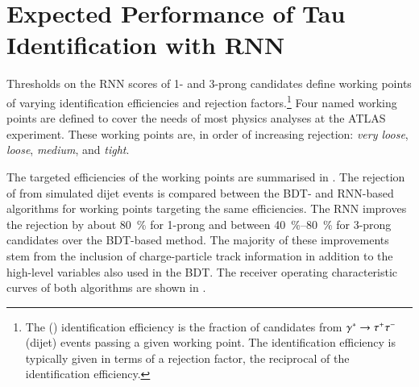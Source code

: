 \section{Expected Performance of Tau Identification with RNN}%
\label{sec:tauid_perf}

Thresholds on the RNN scores of 1- and 3-prong \tauhadvis candidates
define working points of varying \tauhadvis identification
efficiencies and \faketauhadvis rejection factors.\footnote{The
  \truetauhadvis (\faketauhadvis) identification efficiency is the
  fraction of \tauhadvis candidates from $\gammastar \to \tautau$
  (dijet) events passing a given working point. The \faketauhadvis
  identification efficiency is typically given in terms of a rejection
  factor, the reciprocal of the identification efficiency.} Four named
working points are defined to cover the needs of most physics analyses
at the ATLAS experiment. These working points are, in order of
increasing \faketauhadvis rejection: \emph{very loose}, \emph{loose},
\emph{medium}, and \emph{tight}.

The targeted \truetauhadvis efficiencies of the working points are
summarised in . The rejection of \faketauhadvis from
simulated dijet events is compared between the BDT- and RNN-based
\tauid algorithms for working points targeting the same \truetauhadvis
efficiencies. The RNN \tauid improves the \faketauhadvis rejection by
about \SI{80}{\percent} for 1-prong and between
\SIrange{40}{80}{\percent} for 3-prong \tauhadvis candidates over the
BDT-based method. The majority of these improvements stem from the
inclusion of charge-particle track information in addition to the
high-level variables also used in the BDT. The receiver operating
characteristic curves of both algorithms are shown in
.

\begin{table}[htbp]
  \centering

  \caption{Summary of working points defined for the BDT and RNN-based
    \tauid. Only the targeted \truetauhadvis efficiency (target
    \truetauhadvis eff.) of the working points is given which can
    deviate by ca.\ \SI{1}{\percent} from the actual efficiency
    observed in simulated $\gammastar \to \tautau$ events. The
    \faketauhadvis rejection is evaluated using the \tauhadvis
    candidate sample from dijet events. The table is adapted from
    Ref.~\cite{ATL-PHYS-PUB-2019-033}.}%
  \label{tab:rnn_wps}

  
\end{table}

